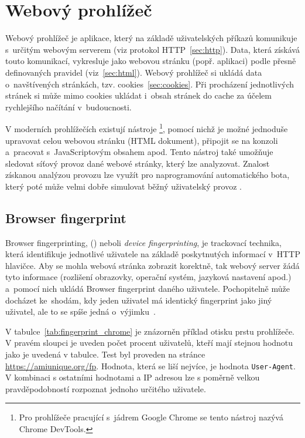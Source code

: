 \section{Webový prohlížeč}
\label{sec:web_browser}
Webový prohlížeč je aplikace, který na základě uživatelských příkazů komunikuje s~určitým webovým serverem (viz protokol HTTP~\ref{sec:http}). Data, která získává touto komunikací, vykresluje jako webovou stránku (popř. aplikaci) podle přesně definovaných pravidel (viz~\ref{sec:html}). Webový prohlížeč si ukládá data o~navštívených stránkách, tzv. cookies~\ref{sec:cookies}. Při procházení jednotlivých stránek si může mimo cookies ukládat i~obsah stránek do cache za účelem rychlejšího načítání v~budoucnosti.

V moderních prohlížečích existují nástroje \footnote{Pro prohlížeče pracující s~jádrem Google Chrome se tento nástroj nazývá Chrome DevTools.}, pomocí nichž je možné jednoduše upravovat celou webovou stránku (HTML dokument), připojit se na konzoli a~pracovat s~JavaScriptovým obsahem apod. Tento nástroj také umožňuje sledovat síťový provoz dané webové stránky, který lze analyzovat. Znalost získanou analýzou provozu lze využít pro naprogramování automatického bota, který poté může velmi dobře simulovat běžný uživatelský provoz \cite{bib:google_inspect}.

\subsection*{Browser fingerprint}
\label{sec:browser_fingerprint}
Browser fingerprinting, () neboli \textit{device fingerprinting}, je trackovací technika, která identifikuje jednotlivé uživatele na základě poskytnutých informací v~HTTP hlavičce. Aby se mohla webová stránka zobrazit korektně, tak webový server žádá tyto informace (rozlišení obrazovky, operační systém, jazyková nastavení apod.) a~pomocí nich ukládá Browser fingerprint daného uživatele. Pochopitelně může docházet ke~shodám, kdy jeden uživatel má identický fingerprint jako jiný uživatel, ale to se spíše jedná o~výjimku~\cite{bib:browser_fingerprint}.

V tabulce~\ref{tab:fingerprint_chrome} je znázorněn příklad otisku prstu prohlížeče. V pravém sloupci je uveden počet procent uživatelů, kteří mají stejnou hodnotu jako je uvedená v tabulce. Test byl proveden na stránce \href{https://amiunique.org/fp}{https://amiunique.org/fp}. Hodnota, která se liší nejvíce, je hodnota \texttt{User-Agent}. V kombinaci s ostatními hodnotami a IP adresou lze s poměrně velkou pravděpodobností rozpoznat jednoho určitého uživatele.

